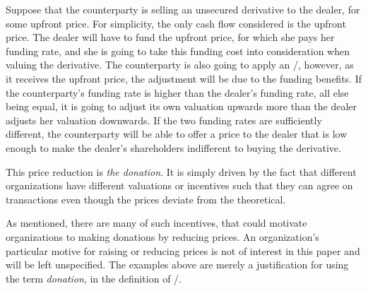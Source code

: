 \documentclass[main.tex]{subfiles}
\begin{document}
        \begin{example}
        Suppose that the counterparty is selling an unsecured derivative to the dealer, 
        for some upfront price. 
        For simplicity, the only cash flow considered is the upfront price.
        The dealer will have to fund the upfront price, for which she pays her funding rate,
        and she is going to take this funding cost into consideration when valuing the derivative.
        The counterparty is also going to apply an \FVA/, however, as it receives the upfront price,
        the adjustment will be due to the funding benefits.
        If the counterparty's funding rate is higher than the dealer's funding rate,
        all else being equal, it is going to adjust its own valuation upwards more 
        than the dealer adjusts her valuation downwards. 
        If the two funding rates are sufficiently different, 
        the counterparty will be able to offer a price to the dealer
        that is low enough to make the dealer's shareholders indifferent to buying the derivative.

        This price reduction is \textit{the donation}.
        It is simply driven by the fact that different organizations 
        have different valuations or incentives such that they can agree on transactions
        even though the prices deviate from the theoretical.
        \end{example}

        As mentioned, there are many of such incentives, 
        that could motivate organizations to making donations by reducing prices. 
        An organization's particular motive for raising or reducing prices
        is not of interest in this paper and will be left unspecified.
        The examples above are merely a justification for using the term \textit{donation},
        in the definition of \FVA/.
\end{document}
